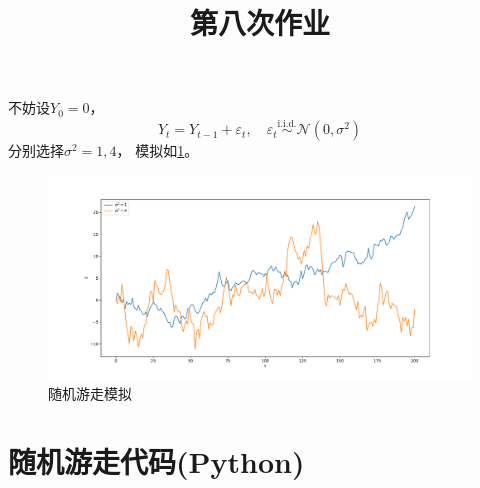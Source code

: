 \documentclass[cn]{homework}
\title{第八次作业}
\begin{document}
    \maketitle

    \problem

    \problem
    不妨设$Y_0=0$，
    \[Y_t=Y_{t-1}+\varepsilon_t,\quad
    \varepsilon_t\overset{\text{i.i.d.}}\sim\mathcal N(0,\sigma^2)\]
    分别选择$\sigma^2=1,4$，
    模拟如\cref{fig:simulation}。
    \begin{figure}[h]
        \centering
        \includegraphics[width=\linewidth]{simulation}
        \caption{随机游走模拟}
        \label{fig:simulation}
    \end{figure}

    \appendix
    \section{随机游走代码(Python)}
    
\end{document}
